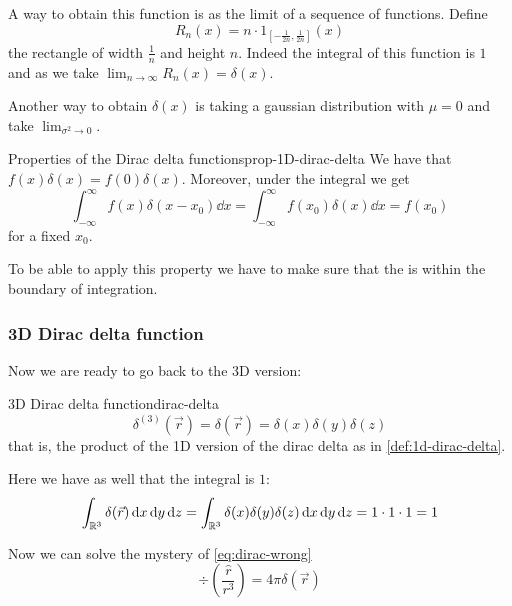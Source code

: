 \documentclass[12pt]{extarticle}
\begin{document}
A way to obtain this function is as the limit of a sequence of functions. Define
\begin{equation}
    R_n(x) = n \cdot 1_{[-\frac{1}{2n}, \frac{1}{2n}]}(x)
\end{equation}
the rectangle of width $\frac{1}{n}$ and height $n$.
Indeed the integral of this function is $1$ and as we take $\lim_{n \to \infty} R_n(x) = \delta(x)$.

Another way to obtain $\delta(x)$ is taking a gaussian distribution with $\mu = 0$ and take $\lim_{\sigma^2 \to 0}$.

\begin{proposition}{Properties of the Dirac delta functions}{prop-1D-dirac-delta}
    We have that $f(x)\delta(x) = f(0) \delta(x)$.
    Moreover, under the integral we get
    \begin{equation}
        \int_{-\infty}^{\infty} f(x) \delta(x - x_0) \dd{x} = \int_{-\infty}^{\infty} f(x_0) \delta(x) \dd{x} = f(x_0)
    \end{equation}
    for a fixed $x_0$.
\end{proposition}

To be able to apply this property we have to make sure that the  is within the boundary of integration.

\subsubsection{3D Dirac delta function}

Now we are ready to go back to the 3D version:
\begin{definition}{3D Dirac delta function}{dirac-delta}
    \begin{equation}
        \delta^{(3)}(\vec r) = \delta(\vec r) = \delta(x) \delta(y) \delta(z)
    \end{equation}
    that is, the product of the 1D version of the dirac delta as in \cref{def:1d-dirac-delta}.
\end{definition}

Here we have as well that the integral is $1$:
\begin{equation}
    \int_{\mathbb{R}^3} \delta(\vec r) \dd{x} \dd{y} \dd{z} = \int_{\mathbb{R}^3} \delta(x) \delta(y) \delta(z) \dd{x} \dd{y} \dd{z} = 1 \cdot 1 \cdot 1 = 1
\end{equation}

Now we can solve the mystery of \cref{eq:dirac-wrong}
\begin{equation}
    \label{eq:dirac-delta-ok}
    \div \left( \frac{\hat r}{r^3} \right) = 4 \pi \delta(\vec r)
\end{equation}
\end{document}
